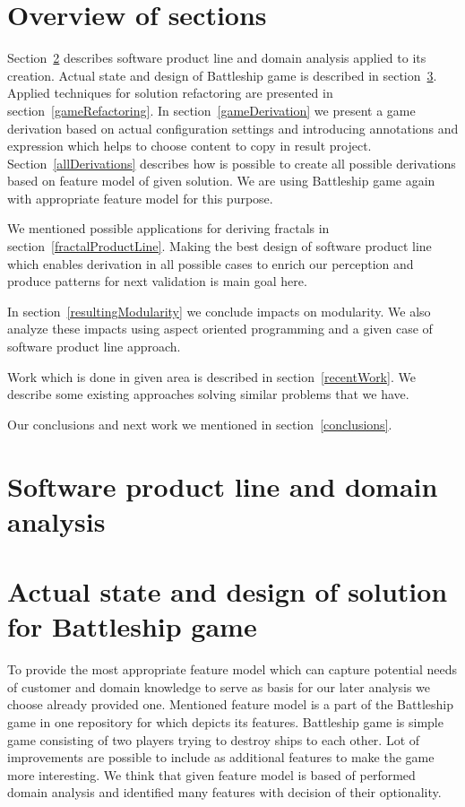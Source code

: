 \documentclass[11pt,slovak,a4paper,twoside]{article}
\begin{document}
\section{Overview of sections} \label{content}

Section~\ref{domainAnalysis} describes software product line and domain analysis applied to its creation. Actual state and design of Battleship game is described in section~\ref{actualGameState}. Applied techniques for solution refactoring are presented in section~\ref{gameRefactoring}. In section~\ref{gameDerivation} we present a game derivation based on actual configuration settings and introducing annotations and expression which helps to choose content to copy in result project. 
Section~\ref{allDerivations} describes how is possible to create all possible derivations based on feature model of given solution. We are using Battleship game again with appropriate feature model for this purpose. 

We mentioned possible applications for deriving fractals in section~\ref{fractalProductLine}. Making the best design of software product line which enables derivation in all possible cases to enrich our perception and produce patterns for next validation is main goal here.  

In section~\ref{resultingModularity} we conclude impacts on modularity. We also analyze these impacts using aspect oriented programming and a given case of software product line approach.

Work which is done in given area is described in section~\ref{recentWork}. We describe some existing approaches solving similar problems that we have.

Our conclusions and next work we mentioned in section~\ref{conclusions}.



\section{Software product line and domain analysis} \label{domainAnalysis}


\section{Actual state and design of solution for Battleship game} \label{actualGameState}

To provide the most appropriate feature model which can capture potential needs of customer and domain knowledge to serve as basis for our later analysis we choose already provided one. Mentioned feature model is a part of the Battleship game in one repository for which depicts its features. Battleship game is simple game consisting of two players trying to destroy ships to each other. Lot of improvements are possible to include as additional features to make the game more interesting. We think that given feature model is based of performed domain analysis and identified many features with decision of their optionality.
\end{document}
